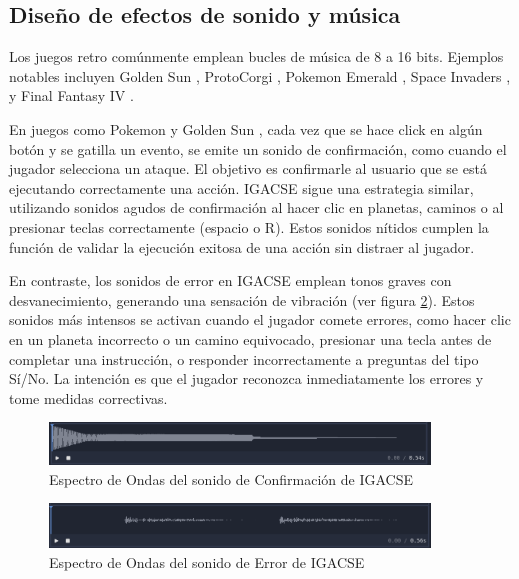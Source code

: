 \subsection{Diseño de efectos de sonido y música}

Los juegos retro comúnmente emplean bucles de música de 8 a 16 bits. Ejemplos notables incluyen Golden Sun \cite{Wiki_Golden_Sun}, ProtoCorgi \cite{ProtoCorgi}, Pokemon Emerald \cite{PokemonEmerald}, Space Invaders \cite{SpaceInvaders}, y Final Fantasy IV \cite{FinalFantasyIV}.

En juegos como Pokemon \cite{PokemonEmerald} y Golden Sun \cite{Wiki_Golden_Sun}, cada vez que se hace click en algún botón y se gatilla un evento, se emite un sonido de confirmación, como cuando el jugador selecciona un ataque. El objetivo es confirmarle al usuario que se está ejecutando correctamente una acción. IGACSE sigue una estrategia similar, utilizando sonidos agudos de confirmación al hacer clic en planetas, caminos o al presionar teclas correctamente (espacio o R). Estos sonidos nítidos cumplen la función de validar la ejecución exitosa de una acción sin distraer al jugador.

En contraste, los sonidos de error en IGACSE emplean tonos graves con desvanecimiento, generando una sensación de vibración (ver figura \ref{EspectroOndasSonidoError}). Estos sonidos más intensos se activan cuando el jugador comete errores, como hacer clic en un planeta incorrecto o un camino equivocado, presionar una tecla antes de completar una instrucción, o responder incorrectamente a preguntas del tipo Sí/No. La intención es que el jugador reconozca inmediatamente los errores y tome medidas correctivas.

\begin{figure}[h]
	\centering
	\includegraphics[width=0.9\textwidth]{imagenes/EspectroOndasConfirmacion.png}
	\caption{Espectro de Ondas del sonido de Confirmación de IGACSE}
	\label{EspectroOndasSonidoConfirmacion}
\end{figure}

\begin{figure}[h]
	\centering
	\includegraphics[width=0.9\textwidth]{imagenes/EspectroOndasError.png}
	\caption{Espectro de Ondas del sonido de Error de IGACSE}
	\label{EspectroOndasSonidoError}
\end{figure}


